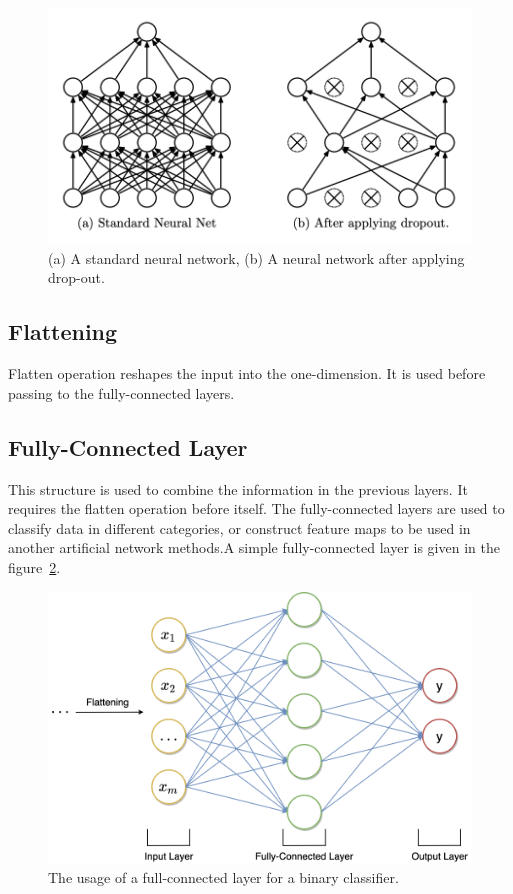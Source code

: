 \begin{figure}[h]
	\centering
	\includegraphics[width=.8\linewidth]{fig/dropout.png}
	\caption{(a) A standard neural network, (b) A neural network after applying drop-out\cite{dropout_article}.}
	\label{fig:dropout}
\end{figure}

\subsection{Flattening}

Flatten operation reshapes the input into the one-dimension. It is used before passing to the fully-connected layers.

\subsection{Fully-Connected Layer}

This structure is used to combine the information in the previous layers. It requires the flatten operation before itself. The fully-connected layers are used to classify data in different categories, or construct feature maps to be used in another artificial network methods.A simple fully-connected layer is given in the figure~\ref{fig:fully_connected_layer}.

\begin{figure}[h]
	\centering
	\includegraphics[width=.8\linewidth]{fig/fullyConnected.png}
	\vspace*{2mm}
	\caption{The usage of a full-connected layer for a binary classifier.}
	\label{fig:fully_connected_layer}
\end{figure}

